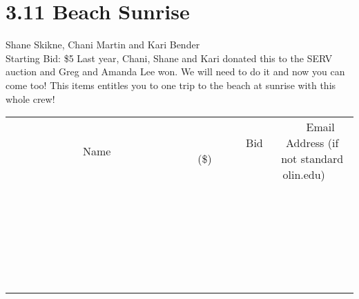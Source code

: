 \documentclass[11pt]{article}
\begin{document}
\section*{3.11 Beach Sunrise}
Shane Skikne, Chani  Martin and Kari Bender
\\
Starting Bid: \$5
\newline
Last year, Chani, Shane and Kari donated this to the SERV auction and Greg and Amanda Lee won. We will need to do it and now you can come too! This items entitles you to one trip to the beach at sunrise with this whole crew!
\\[6ex]
\begin{tabular}{c c c}
~~~~~~~~~~~~~Name~~~~~~~~~~~~~ & ~~~~~~~~~Bid (\$)~~~~~~~~~  & ~~~Email Address (if not standard olin.edu)~~~\\
 & & \\
\hline
 & & \\
\hline
 & & \\
\hline
 & & \\
\hline
 & & \\
\hline
 & & \\
\hline
 & & \\
\hline
 & & \\
\hline
 & & \\
\hline
 & & \\
\hline
 & & \\
\hline
 & & \\
\hline
 & & \\
\hline
 & & \\
\hline
 & & \\
\hline
 & & \\
\hline
 & & \\
\hline
 & & \\
\hline
 & & \\
\hline
 & & \\
\hline
 & & \\
\hline
 & & \\
\hline
 & & \\
\hline
 & & \\
\hline
 & & \\
\hline
 & & \\
\hline
\end{tabular}
\newpage
\end{document}
